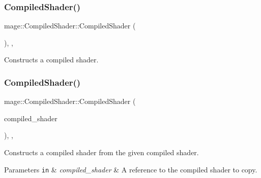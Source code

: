 \subsubsection{\texorpdfstring{Compiled\+Shader()}{CompiledShader()}\hspace{0.1cm}{\footnotesize\ttfamily [1/3]}}
{\footnotesize\ttfamily mage\+::\+Compiled\+Shader\+::\+Compiled\+Shader (\begin{DoxyParamCaption}{ }\end{DoxyParamCaption})\hspace{0.3cm}{\ttfamily [protected]}, {\ttfamily [default]}, {\ttfamily [noexcept]}}

Constructs a compiled shader. \hypertarget{classmage_1_1_compiled_shader_a2b7a4b283254781d5420e562d58fc49d}{}\label{classmage_1_1_compiled_shader_a2b7a4b283254781d5420e562d58fc49d} 
\subsubsection{\texorpdfstring{Compiled\+Shader()}{CompiledShader()}\hspace{0.1cm}{\footnotesize\ttfamily [2/3]}}
{\footnotesize\ttfamily mage\+::\+Compiled\+Shader\+::\+Compiled\+Shader (\begin{DoxyParamCaption}\item[{const \hyperlink{classmage_1_1_compiled_shader}{Compiled\+Shader} \&}]{compiled\+\_\+shader }\end{DoxyParamCaption})\hspace{0.3cm}{\ttfamily [protected]}, {\ttfamily [default]}, {\ttfamily [noexcept]}}

Constructs a compiled shader from the given compiled shader.


\begin{DoxyParams}[1]{Parameters}
\mbox{\tt in}  & {\em compiled\+\_\+shader} & A reference to the compiled shader to copy. \\
\hline
\end{DoxyParams}
\hypertarget{classmage_1_1_compiled_shader_a3f497ba71462ff3407d72034fee71c06}{}\label{classmage_1_1_compiled_shader_a3f497ba71462ff3407d72034fee71c06} 
